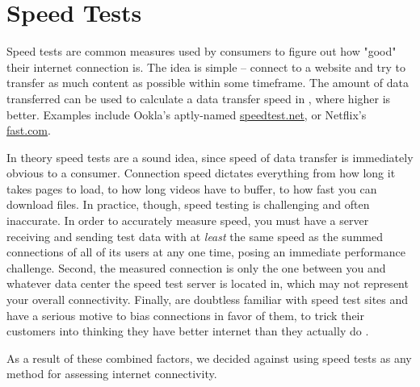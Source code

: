 \section{Speed Tests}\label{sec:speed_test_background}

Speed tests are common measures used by consumers to figure out how "good" their internet connection is. The idea is simple -- connect to a website and try to transfer as much content as possible within some timeframe. The amount of data transferred can be used to calculate a data transfer speed in \Mbps, where higher is better. Examples include Ookla's aptly-named \url{speedtest.net}, or Netflix's \url{fast.com}.

In theory speed tests are a sound idea, since speed of data transfer is immediately obvious to a consumer. Connection speed dictates everything from how long it takes pages to load, to how long videos have to buffer, to how fast you can download files. In practice, though, speed testing is challenging and often inaccurate. In order to accurately measure speed, you must have a server receiving and sending test data with at \textit{least} the same speed as the summed connections of all of its users at any one time, posing an immediate performance challenge. Second, the measured connection is only the one between you and whatever data center the speed test server is located in, which may not represent your overall connectivity. Finally, \isps are doubtless familiar with speed test sites and have a serious motive to bias connections in favor of them, to trick their customers into thinking they have better internet than they actually do \cite{SpeedtestComcast2020}.

As a result of these combined factors, we decided against using speed tests as any method for assessing internet connectivity.
